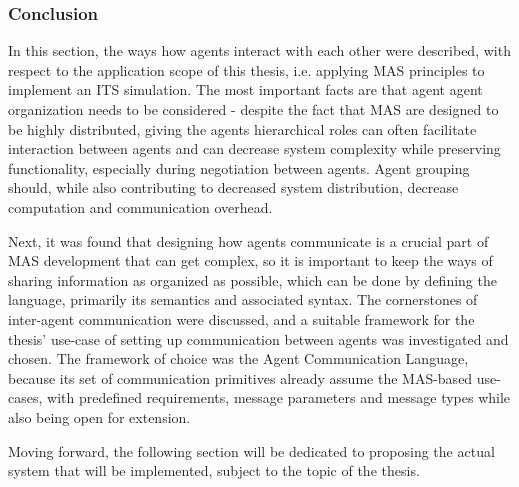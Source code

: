 \documentclass[main.tex]{subfiles}
\begin{document}
\subsubsection{Conclusion}

In this section, the ways how agents interact with each other were described, with respect to the
application scope of this thesis, i.e. applying MAS principles to implement an ITS simulation. The most important
facts are that agent agent organization needs to be considered - despite the fact that MAS are
designed to be highly distributed, giving the agents hierarchical roles can often facilitate
interaction between agents and can decrease system complexity while preserving functionality,
especially during negotiation between agents. Agent grouping should, while also contributing to
decreased system distribution, decrease computation and communication overhead. 

Next, it was found that designing how agents communicate is a crucial part of MAS development
that can get complex, so it is important to keep the ways of sharing information as organized
as possible, which can be done by defining the language, primarily its semantics and associated
syntax.  The cornerstones of inter-agent communication were discussed, and a suitable framework
for the thesis' use-case of setting up communication between agents was investigated and
chosen. The framework of choice was the Agent Communication Language, because its set of
communication primitives already assume the MAS-based use-cases, with predefined requirements,
message parameters and message types while also being open for extension.

Moving forward, the following section will be dedicated to proposing the actual system that will 
be implemented, subject to the topic of the thesis. 
\end{document}
